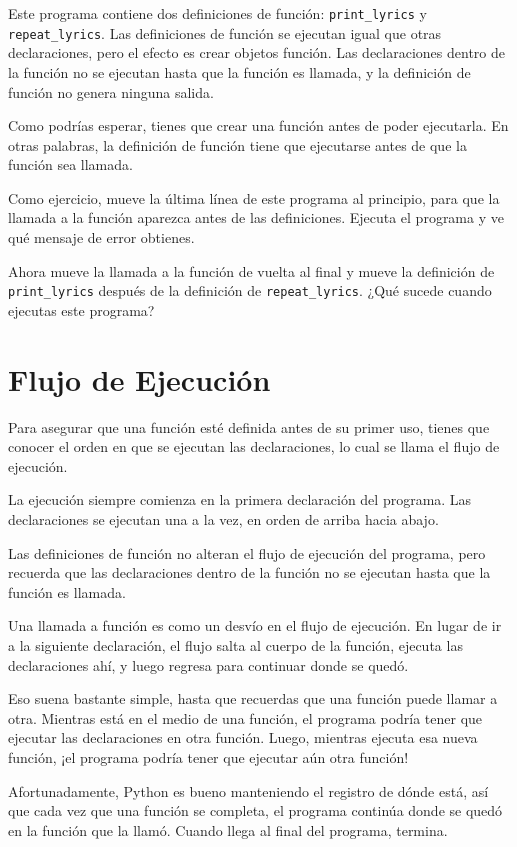 Este programa contiene dos definiciones de función: \texttt{print\_lyrics} y \texttt{repeat\_lyrics}. Las definiciones de función se ejecutan igual que otras declaraciones, pero el efecto es crear objetos función. Las declaraciones dentro de la función no se ejecutan hasta que la función es llamada, y la definición de función no genera ninguna salida.

Como podrías esperar, tienes que crear una función antes de poder ejecutarla. En otras palabras, la definición de función tiene que ejecutarse antes de que la función sea llamada.

Como ejercicio, mueve la última línea de este programa al principio, para que la llamada a la función aparezca antes de las definiciones. Ejecuta el programa y ve qué mensaje de error obtienes.

Ahora mueve la llamada a la función de vuelta al final y mueve la definición de \texttt{print\_lyrics} después de la definición de \texttt{repeat\_lyrics}. ¿Qué sucede cuando ejecutas este programa?

\section{Flujo de Ejecución}

Para asegurar que una función esté definida antes de su primer uso, tienes que conocer el orden en que se ejecutan las declaraciones, lo cual se llama el flujo de ejecución.

La ejecución siempre comienza en la primera declaración del programa. Las declaraciones se ejecutan una a la vez, en orden de arriba hacia abajo.

Las definiciones de función no alteran el flujo de ejecución del programa, pero recuerda que las declaraciones dentro de la función no se ejecutan hasta que la función es llamada.

Una llamada a función es como un desvío en el flujo de ejecución. En lugar de ir a la siguiente declaración, el flujo salta al cuerpo de la función, ejecuta las declaraciones ahí, y luego regresa para continuar donde se quedó.

Eso suena bastante simple, hasta que recuerdas que una función puede llamar a otra. Mientras está en el medio de una función, el programa podría tener que ejecutar las declaraciones en otra función. Luego, mientras ejecuta esa nueva función, ¡el programa podría tener que ejecutar aún otra función!

Afortunadamente, Python es bueno manteniendo el registro de dónde está, así que cada vez que una función se completa, el programa continúa donde se quedó en la función que la llamó. Cuando llega al final del programa, termina.


